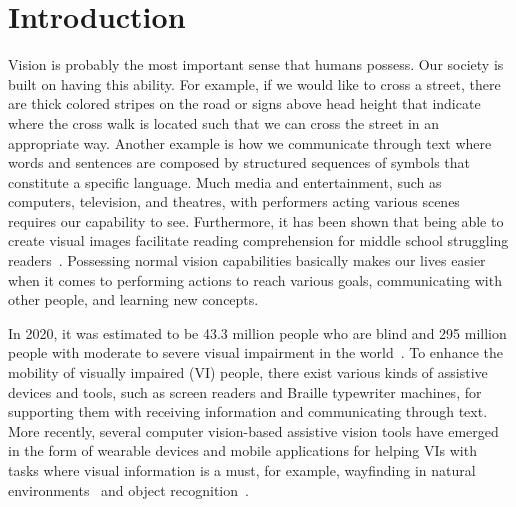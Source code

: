 
\chapter{Introduction}
\label{chap:introduction}

Vision is probably the most important sense that humans possess. Our society is built on having this ability. For example, if we would like to cross a street, there are thick colored stripes on the road or signs above head height that indicate where the cross walk is located such that we can cross the street in an appropriate way. Another example is how we communicate through text where words and sentences are composed by structured sequences of symbols that constitute a specific language. Much media and entertainment, such as computers, television, and theatres, with performers acting various scenes requires our capability to see. Furthermore, it has been shown that being able to create visual images facilitate reading comprehension for middle school struggling readers~\cite{hibbing2003picture}. Possessing normal vision capabilities basically makes our lives easier when it comes to performing actions to reach various goals, communicating with other people, and learning new concepts.  

In 2020, it was estimated to be 43.3 million people who are blind and 295 million people with moderate to severe visual impairment in the world~\cite{bourne2021trends}. To enhance the mobility of visually impaired (VI) people, there exist various kinds of assistive devices and tools, such as screen readers and Braille typewriter machines, for supporting them with receiving information and communicating through text. More recently, several computer vision-based assistive vision tools have emerged in the form of wearable devices and mobile applications for helping VIs with tasks where visual information is a must, for example, wayfinding in natural environments~\cite{coughlan2009functional, kacorri2018environmental, loomis2020assisting} and object recognition~\cite{ahmetovic2020recog, kacorri2017teachable, lee2019hands}. 

